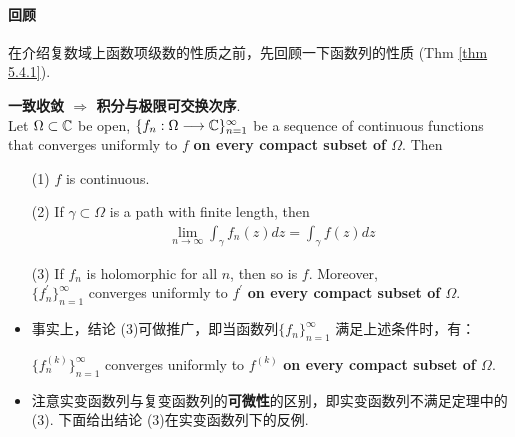 \paragraph{回顾}
在介绍复数域上函数项级数的性质之前，先回顾一下函数列的性质 (Thm \ref{thm 5.4.1}).
\begin{thm}\label{thm 6.2.1}
	\textbf{一致收敛 $\Rightarrow$ 积分与极限可交换次序}.\\
	Let $\Omega \subset \mathbb{C}$ be open, $\{ f_n : \Omega \longrightarrow \mathbb{C} \}_{n = 1}^{\infty}$ be a sequence of continuous functions that converges uniformly to $f$ \textbf{on every compact subset of $\Omega$}. Then
	\begin{enumerate}
		\item[(1)]$f$ is continuous.
		
		\vspace{1em}
		
		\item[(2)]If $\gamma \subset \Omega$ is a path with finite length, then
		\begin{align}
			\lim_{n \to \infty}{\int_{\gamma}{f_{n}(z) dz}} = \int_{\gamma}{f(z) dz}
		\end{align}
		
		\vspace{1em}
		
		\item[(3)]If $f_n$ is holomorphic for all $n$, then so is $f$. Moreover, \\
		$\{ f_{n}^{'} \}_{n = 1}^{\infty}$ converges uniformly to $f^{'}$ \textbf{on every compact subset of $\Omega$}.
	\end{enumerate}
	
	\vspace{1em}
	\begin{rmk}
		\begin{itemize}
			\item 事实上，结论 (3)可做推广，即当函数列$\{ f_n \}_{n = 1}^{\infty}$ 满足上述条件时，有：
			\begin{center}
				$\{ f_{n}^{(k)} \}_{n = 1}^{\infty}$ converges uniformly to $f^{(k)}$ \textbf{on every compact subset of $\Omega$}.
			\end{center}
			
			\vspace{2em}
			
			\item 注意实变函数列与复变函数列的\textbf{可微性}的区别，即实变函数列不满足定理中的 (3). 下面给出结论 (3)在实变函数列下的反例.
			

\end{itemize}
\end{rmk}
\end{thm}
